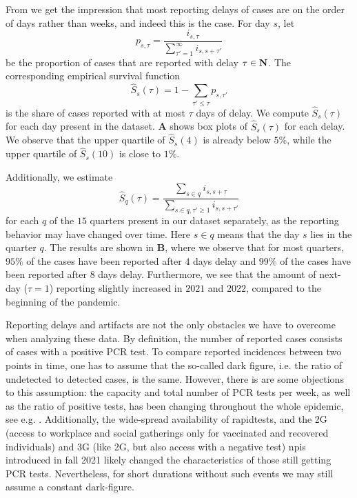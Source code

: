 From  we get the impression that most reporting delays of cases are on the order of days rather than weeks, and indeed this is the case. For day $s$, let
$$
    p_{s,\tau} = \frac{i_{s,\tau}}{\sum_{\tau' = 1}^\infty i_{s,s + \tau'}}
$$
be the proportion of cases that are reported with delay $\tau \in\mathbf N$. The corresponding empirical survival function 
$$
    \hat S_{s}(\tau) = 1 - \sum_{\tau' \leq \tau} p_{s,\tau'}
$$
is the share of cases reported with at most $\tau$ days of delay. We compute $\hat S_s(\tau)$ for each day present in the dataset.  \textbf{A} shows box plots of $\hat S_{s}(\tau)$ for each delay. We observe that the upper quartile of $\hat S_s(4)$ is already below $5\%$, while the upper quartile of $\hat S_s(10)$ is close to $1\%$. 

Additionally, we estimate 
$$
    \hat S_{q}(\tau) = \frac{\sum_{s \in q} i_{s,s + \tau}}{\sum_{s \in q, \tau' \geq 1} i_{s, s+ \tau'}}
$$
for each $q$ of the $15$ quarters present in our dataset separately, as the reporting behavior may have changed over time. Here $s\in q$ means that the day $s$ lies in the quarter $q$. The results are shown in  \textbf{B}, where we observe that for most quarters, $95\%$ of the cases have been reported after $4$ days delay and $99\%$ of the cases have been reported after $8$ days delay. 
Furthermore, we see that the amount of next-day ($\tau = 1$) reporting slightly increased in $2021$ and $2022$, compared to the beginning of the pandemic.

%

Reporting delays and artifacts are not the only obstacles we have to overcome when analyzing these data. By definition, the number of reported cases consists of cases with a positive PCR test. To compare reported incidences between two points in time, one has to assume that the so-called dark figure, i.e. the ratio of undetected to detected cases, is the same. However, there is are some objections to this assumption: the capacity and total number of PCR tests per week, as well as the ratio of positive tests, has been changing throughout the whole epidemic, see e.g. \citep{Willrich2021Update}. Additionally, the wide-spread availability of rapidtests, and the 2G (access to workplace and social gatherings only for vaccinated and recovered individuals) and 3G (like 2G, but also access with a negative test) \glspl{npi} introduced in fall 2021 likely changed the characteristics of those still getting PCR tests. Nevertheless, for short durations without such events we may still assume a constant dark-figure.

